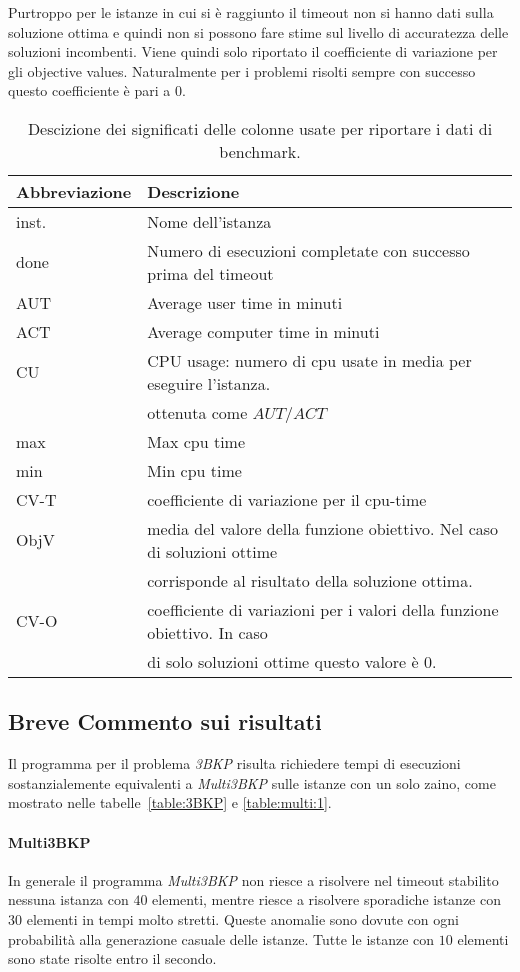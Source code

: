 Purtroppo per le istanze in cui si è raggiunto il timeout non si hanno dati
sulla soluzione ottima e quindi non si possono 
fare stime sul livello di accuratezza delle soluzioni incombenti.
Viene quindi solo riportato il coefficiente di variazione per gli
objective values. Naturalmente 
per i problemi risolti sempre con successo questo coefficiente è pari a $0$.

\begin{table}
\centering
\small
\begin{tabular}{| l| l |}
\hline
Abbreviazione & Descrizione \\
\hline
inst. & Nome dell'istanza \\
done & Numero di esecuzioni completate con successo prima del timeout\\
AUT & Average user time in minuti \\
ACT & Average computer time in minuti\\
CU  & CPU usage: numero di cpu usate in media per eseguire l'istanza. \\
	& ottenuta come $AUT/ACT$\\
max & Max cpu time \\
min & Min cpu time \\
CV-T & coefficiente di variazione per il cpu-time \\
ObjV & media del valore della funzione obiettivo. Nel caso di soluzioni ottime \\
	& corrisponde al risultato della soluzione ottima.\\
CV-O & coefficiente di variazioni per i valori della funzione obiettivo. In caso \\
& di solo soluzioni ottime questo valore è $0$. \\
\hline
\end{tabular}
\caption{Descizione dei significati delle colonne usate per riportare i dati
di benchmark.}
\label{table:description}
\end{table}


\subsection{Breve Commento sui risultati}
Il programma per il problema \emph{3BKP} risulta richiedere tempi di esecuzioni
sostanzialemente equivalenti a \emph{Multi3BKP} sulle istanze con un solo 
zaino, come mostrato nelle tabelle~\ref{table:3BKP} e \ref{table:multi:1}.

\paragraph{Multi3BKP}
In generale il programma \emph{Multi3BKP} non riesce a risolvere nel timeout
stabilito nessuna istanza con $40$ elementi, mentre riesce a risolvere sporadiche
istanze con $30$ elementi in tempi molto stretti. Queste anomalie sono dovute
con ogni probabilità alla generazione casuale delle istanze.
Tutte le istanze con $10$ elementi sono state risolte entro il secondo.










